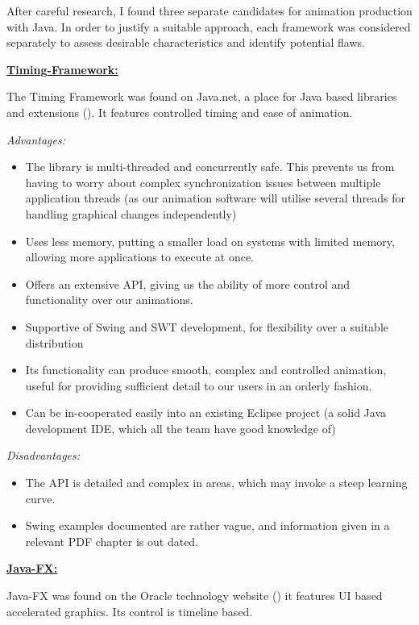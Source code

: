 \documentclass{l3proj}
\begin{document}
After careful research, I found three separate candidates for animation production with Java. In order to justify a suitable approach, each framework was considered separately to assess desirable characteristics and identify potential flaws. 

\underline{\textbf{Timing-Framework:}}

The Timing Framework was found on Java.net, a place for Java based libraries and extensions (\cite{website:TimingFramework}). It features controlled timing and ease of animation.

\textit{Advantages:}
\begin{itemize}
	\item The library is multi-threaded and concurrently safe. This prevents us from having to worry about complex synchronization issues between multiple application threads (as our animation software will utilise several threads for handling graphical changes independently)
	\item Uses less memory, putting a smaller load on systems with limited memory, allowing more applications to execute at once. 
	\item Offers an extensive API, giving us the ability of more control and functionality over our animations.
	\item Supportive of Swing and SWT development, for flexibility over a suitable distribution
	\item Its functionality can produce smooth, complex and controlled animation, useful for providing sufficient detail to our users in an orderly fashion.
	\item Can be in-cooperated easily into an existing Eclipse project (a solid Java development IDE, which all the team have good knowledge of)
\end{itemize}

\textit{Disadvantages:}
\begin{itemize}
	\item The API is detailed and complex in areas, which may invoke a steep learning curve.
	\item Swing examples documented are rather vague, and information given in a relevant PDF chapter is out dated.
\end{itemize}

\underline{\textbf{Java-FX:}}

Java-FX was found on the Oracle technology website (\cite{website:JavaFX}) it features UI based accelerated graphics. Its control is timeline based.
\end{document}
